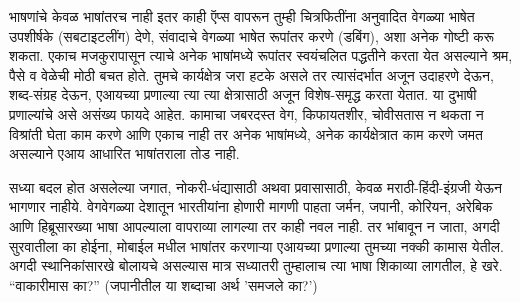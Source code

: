 भाषणांचे केवळ भाषांतरच नाही इतर काही ऍप्स वापरून तुम्ही चित्रफितींना अनुवादित वेगळ्या भाषेत उपशीर्षके (सबटाइटलींग) देणे, संवादाचे वेगळ्या भाषेत रूपांतर करणे (डबिंग), अशा अनेक गोष्टी करू शकता. एकाच मजकुरापासून त्याचे अनेक भाषांमध्ये रूपांतर स्वयंचलित पद्धतीने करता येत असल्याने श्रम, पैसे व वेळेची मोठी बचत होते. तुमचे कार्यक्षेत्र जरा हटके असले तर त्यासंदर्भात अजून उदाहरणे देऊन, शब्द-संग्रह देऊन, एआयच्या प्रणाल्या त्या त्या क्षेत्रासाठी अजून विशेष-समृद्ध करता येतात. या दुभाषी प्रणाल्यांचे असे असंख्य फायदे आहेत. कामाचा जबरदस्त वेग, किफायतशीर, चोवीसतास न थकता न विश्रांती घेता काम करणे आणि एकाच नाही तर अनेक भाषांमध्ये, अनेक कार्यक्षेत्रात काम करणे जमत असल्याने एआय आधारित भाषांतराला तोड नाही.

सध्या बदल होत असलेल्या जगात, नोकरी-धंद्यासाठी अथवा प्रवासासाठी, केवळ मराठी-हिंदी-इंग्रजी येऊन भागणार नाहीये. वेगवेगळ्या देशातून भारतीयांना होणारी मागणी पाहता जर्मन, जपानी, कोरियन, अरेबिक आणि हिब्रूसारख्या भाषा आपल्याला वापराव्या लागल्या तर काही नवल नाही. तर भांबावून न जाता, अगदी सुरवातीला का होईना, मोबाईल मधील भाषांतर करणाऱ्या एआयच्या प्रणाल्या तुमच्या नक्की कामास येतील. अगदी स्थानिकांसारखे बोलायचे असल्यास मात्र सध्यातरी तुम्हालाच त्या भाषा शिकाव्या लागतील, हे खरे. ``वाकारीमास का?'' (जपानीतील या शब्दाचा अर्थ 'समजले का?')